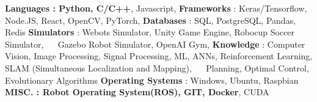 \begin{cventries}  
\skillentry
    {
    \bullet \space \textbf{Languages : Python, C/C++}, Javascript, \newline
    \bullet \space \textbf{Frameworks} : Keras/Tensorflow, Node.JS, React, OpenCV, PyTorch, \newline
    \bullet \space \textbf{Databases} : SQL, PostgreSQL, Pandas, Redis \newline
    \bullet \space \textbf{Simulators} : Webots Simulator, Unity Game Engine, Robocup Soccer Simulator, \newline $\quad$ Gazebo Robot Simulator, OpenAI Gym, \newline
    \bullet \space \textbf{Knowledge} : Computer Vision, Image Processing, Signal Processing, ML, ANNs, Reinforcement Learning, SLAM (Simultaneous Localization and Mapping), \newline $\quad$ Planning, Optimal Control, Evolutionary Algorithms   \newline
    \bullet \space \textbf{Operating Systems} : Windows, Ubuntu, Raspbian \newline
    \bullet \space \textbf{MISC. : Robot Operating System(ROS), GIT, Docker}, CUDA
    }
\end{cventries}
